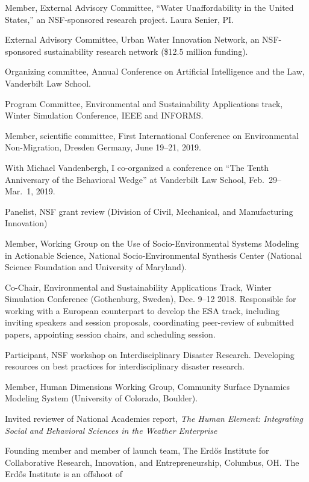 \item[2020--present] Member, External Advisory Committee, ``Water Unaffordability in the United States,'' an NSF-sponsored research project. Laura Senier, PI.
\item[2016--present] External Advisory Committee, Urban Water Innovation Network, an NSF-sponsored sustainability research network (\$12.5 million funding).
\item[2016--present] Organizing committee, Annual Conference on Artificial Intelligence and the Law, Vanderbilt Law School.
\item[2016--present] Program Committee, Environmental and Sustainability Applications track, Winter Simulation Conference, IEEE and INFORMS.
\item[2019] Member, scientific committee, First International Conference on Environmental Non-Migration, Dresden Germany, June 19--21, 2019.
\item[2019] With Michael Vandenbergh, I co-organized a conference on ``The Tenth Anniversary of the Behavioral Wedge'' at Vanderbilt Law School, Feb.~29--Mar.~1, 2019.
\item[2018] Panelist, NSF grant review (Division of Civil, Mechanical, and Manufacturing Innovation)
\item[2018] Member, Working Group on the Use of Socio-Environmental Systems Modeling in Actionable Science, National Socio-Environmental Synthesis Center (National Science Foundation and University of Maryland).
\item[2018] Co-Chair, Environmental and Sustainability Applications Track, Winter Simulation Conference (Gothenburg, Sweden), Dec. 9--12 2018. Responsible for working with a European counterpart to develop the ESA track, including inviting speakers and session proposals, coordinating peer-review of submitted papers, appointing session chairs, and scheduling session.
\item[2017--2018] Participant, NSF workshop on Interdisciplinary Disaster Research. Developing resources on best practices for interdisciplinary disaster research.
\item[2017--2018] Member, Human Dimensions Working Group, Community Surface Dynamics Modeling System (University of Colorado, Boulder).
\item[2017] Invited reviewer of National Academies report, \emph{The Human Element: Integrating Social and Behavioral Sciences in the Weather Enterprise}
\item[2017] Founding member and member of launch team, The Erd\H{o}s Institute for Collaborative Research, Innovation, and Entrepreneurship, Columbus, OH. The Erd\H{o}s Institute is an offshoot of
